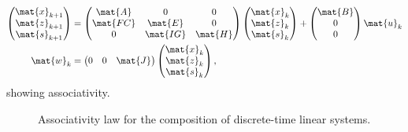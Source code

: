 \begin{equation*}
    \label{eq:dlin-7}
    \begin{aligned}
        \begin{pmatrix}
            \mat{x}_{k+1} \\
            \mat{z}_{k+1} \\
            \mat{s}_{k+1}
        \end{pmatrix}&=
        \begin{pmatrix}
            \mat{A}  & 0        & 0       \\
            \mat{FC} & \mat{E}  & 0       \\
            0        & \mat{IG} & \mat{H}
        \end{pmatrix}\begin{pmatrix}
                         \mat{x}_k\\ \mat{z}_k\\ \mat{s}_k
        \end{pmatrix}+
        \begin{pmatrix}
            \mat{B}\\ 0\\ 0
        \end{pmatrix}\mat{u}_k\\
        \mat{w}_k&=\begin{pmatrix}
                       0& 0& \mat{J}
        \end{pmatrix}\begin{pmatrix}
                         \mat{x}_k\\ \mat{z}_k\\ \mat{s}_k
        \end{pmatrix},
    \end{aligned}
\end{equation*}
showing associativity.

\begin{figure}[tbh]
    \centering
    {
    }
    \caption{Associativity law for the composition of discrete-time linear systems. }
    \label{fig:ass_dyn_syst}
\end{figure}

